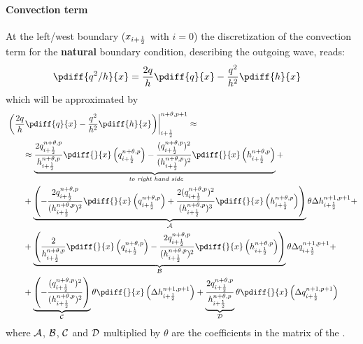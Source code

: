 \paragraph*{Convection term}
At the left/west boundary ($x_{i+\frac{1}{2}}$ with $i=0$) the discretization of the convection term for the \textbf{natural} boundary condition, describing the outgoing wave, reads:
\begin{align}
    \pdiff{q^2/h}{x} & = \frac{2q}{h}\pdiff{q}{x} - \frac{q^2}{h^2}\pdiff{h}{x}
\end{align}
which will be approximated by
\begin{align}
    & \left. \left( \frac{2q}{h}\pdiff{q}{x} - \frac{q^2}{h^2}\pdiff{h}{x}\right) \right|^{n+\theta, p+1}_{i+\half}
    \approx
    \\
    & \qquad \approx \underbrace{\frac{2q^{n+\theta, p}_{i+\half}}{ h^{n+\theta, p}_{i+\half}} \pdiff{}{x}\left( q^{n+\theta, p}_{i+\half} \right)
        - \frac{(q^{n+\theta, p}_{i+\half})^2}{(h^{n+\theta, p}_{i+\half})^2} \pdiff{}{x} \left( h^{n+\theta, p}_{i+\half} \right)}_{\textit{ to right hand side}} +
    \nonumber \\
    & \qquad + \underbrace{\left( -\frac{2q^{n+\theta, p}_{i+\half}}{ (h^{n+\theta, p}_{i+\half})^2}  \pdiff{}{x} \left( q^{n+\theta,p}_{i+\half}  \right)
        + \frac{2(q^{n+\theta, p}_{i+\half})^2}{(h^{n+\theta, p}_{i+\half})^3} \pdiff{}{x} \left( h^{n+\theta,p} _{i+\half} \right)
        \right)}_{\cal A} \theta \Delta h^{n+1, p+1}_{i+\half} +
    \nonumber \\
    & \qquad + \underbrace{\left( \frac{2}{ h^{n+\theta, p}_{i+\half}} \pdiff{}{x} \left( q^{n+\theta, p}_{i+\half} \right)
        -  \frac{2q^{n+\theta, p}_{i+\half}}{(h^{n+\theta, p}_{i+\half})^2} \pdiff{}{x} \left( h^{n+\theta, p}_{i+\half} \right)
        \right)}_{\cal B} \theta \Delta q^{n+1, p+1}_{i+\half} +
    \nonumber \\
    &
    \qquad + \underbrace{\left(- \frac{(q^{n+\theta, p}_{i+\half})^2}{(h^{n+\theta, p}_{i+\half})^2} \right)}_{\cal C} \theta \pdiff{}{x} \left( \Delta h^{n+1, p+1}_{i+\half} \right)
    + \underbrace{\frac{2q^{n+\theta, p}_{i+\half}}{ h^{n+\theta, p}_{i+\half}}}_{\cal D} \theta \pdiff{}{x} \left(  \Delta q^{n+1, p+1}_{i+\half} \right)
\end{align}
where $\cal{A}$, $\cal{B}$, $\cal{C}$ and $\cal{D}$ multiplied by $\theta$ are the coefficients in the matrix of the \deltaformulation.
